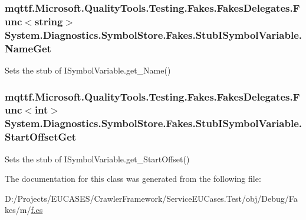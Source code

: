 \hypertarget{class_system_1_1_diagnostics_1_1_symbol_store_1_1_fakes_1_1_stub_i_symbol_variable_a2d42dad9a48b4a6d3a8ac680ae2ce06d}{
\subsubsection[{Name\-Get}]{\setlength{\rightskip}{0pt plus 5cm}mqttf.\-Microsoft.\-Quality\-Tools.\-Testing.\-Fakes.\-Fakes\-Delegates.\-Func$<$string$>$ System.\-Diagnostics.\-Symbol\-Store.\-Fakes.\-Stub\-I\-Symbol\-Variable.\-Name\-Get}}\label{class_system_1_1_diagnostics_1_1_symbol_store_1_1_fakes_1_1_stub_i_symbol_variable_a2d42dad9a48b4a6d3a8ac680ae2ce06d}


Sets the stub of I\-Symbol\-Variable.\-get\-\_\-\-Name()

\hypertarget{class_system_1_1_diagnostics_1_1_symbol_store_1_1_fakes_1_1_stub_i_symbol_variable_ae35671fd6c7c5c80608ae4e62fefd652}{
\subsubsection[{Start\-Offset\-Get}]{\setlength{\rightskip}{0pt plus 5cm}mqttf.\-Microsoft.\-Quality\-Tools.\-Testing.\-Fakes.\-Fakes\-Delegates.\-Func$<$int$>$ System.\-Diagnostics.\-Symbol\-Store.\-Fakes.\-Stub\-I\-Symbol\-Variable.\-Start\-Offset\-Get}}\label{class_system_1_1_diagnostics_1_1_symbol_store_1_1_fakes_1_1_stub_i_symbol_variable_ae35671fd6c7c5c80608ae4e62fefd652}


Sets the stub of I\-Symbol\-Variable.\-get\-\_\-\-Start\-Offset()



The documentation for this class was generated from the following file\-:\begin{DoxyCompactItemize}
\item 
D\-:/\-Projects/\-E\-U\-C\-A\-S\-E\-S/\-Crawler\-Framework/\-Service\-E\-U\-Cases.\-Test/obj/\-Debug/\-Fakes/m/\hyperlink{m_2f_8cs}{f.\-cs}\end{DoxyCompactItemize}

